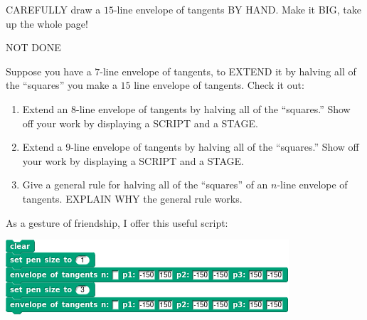 \documentclass[noauthor,nooutcomes,12pt,hints,handout]{ximera}
\begin{document}
\mynewpage






\begin{question}
  CAREFULLY draw a $15$-line envelope of tangents BY HAND. Make it
  BIG, take up the whole page!
  \begin{freeResponse}
    NOT DONE
  \end{freeResponse}
\end{question}
\mynewpage





\begin{question}
  Suppose you have a $7$-line envelope of tangents, to EXTEND it by
  halving all of the ``squares'' you make a $15$ line envelope of
  tangents. Check it out:
  \begin{center}
  \end{center}
  \begin{enumerate}
    \item Extend an $8$-line envelope of tangents by halving all of
      the ``squares.''  Show off your work by displaying a SCRIPT and
      a STAGE.
    \item Extend a $9$-line envelope of tangents by halving all of the
      ``squares.''  Show off your work by displaying a SCRIPT and a
      STAGE.
    \item Give a general rule for halving all of the ``squares'' of an
      $n$-line envelope of tangents. EXPLAIN WHY the general rule works.
  \end{enumerate}
  As a gesture of friendship, I offer this useful script:
  \begin{center}
    \includegraphics{genericExtendedEnvelopeOfTan.png}
  \end{center}
  \begin{freeResponse}

\end{freeResponse}
\end{question}
\end{document}
